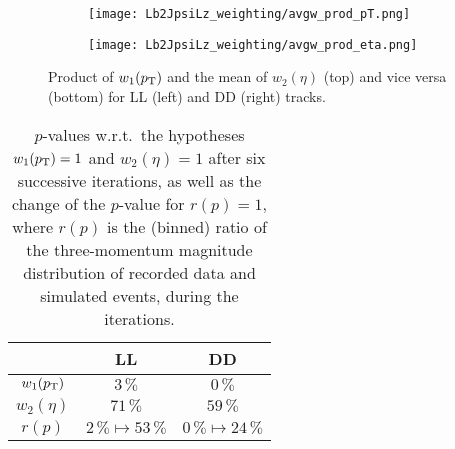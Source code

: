


\begin{figure}[htbp]
    \centering
    \begin{subfigure}{\textwidth}
        \centering
        \texttt{[image: Lb2JpsiLz\_weighting/avgw\_prod\_pT.png]}
    \end{subfigure}
    \par\bigskip 
    \begin{subfigure}{\textwidth}
        \centering
        \texttt{[image: Lb2JpsiLz\_weighting/avgw\_prod\_eta.png]}
    \end{subfigure}
    \caption{Product of $w_1(\mbox{$p_{\mathrm{ T}}$})$ and the mean of $w_2(\eta)$ (top) and vice versa (bottom) for \gls{LL} (left) and \gls{DD} (right) tracks.}
    \label{fig:LbToJpsiLz_avgw_prod}
\end{figure}

\begin{table}[htbp]
    \centering
    \caption{$p$-values w.r.t.\ the hypotheses $w_1(\mbox{$p_{\mathrm{ T}}$})=1$ and $w_2(\eta)=1$ after six successive iterations, as well as the change of the $p$-value for $r(p)=1$, where $r(p)$ is the (binned) ratio of the three-momentum magnitude distribution of recorded data and simulated events, during the iterations.}
    \label{tab:LbToJpsiLz_pvalues}
    \begin{tabular}{ccc}
        \toprule
        & \gls{LL} & \gls{DD} \\
        \midrule
        $w_1(\mbox{$p_{\mathrm{ T}}$})$ & $3\,\%$ & $0\,\%$ \\
        $w_2(\eta)$ & $71\,\%$ & $59\,\%$ \\
        \midrule
        $r(p)$ & $2\,\% \mapsto 53\,\%$ & $0\,\% \mapsto 24\,\%$ \\
        \bottomrule
    \end{tabular}
\end{table}

